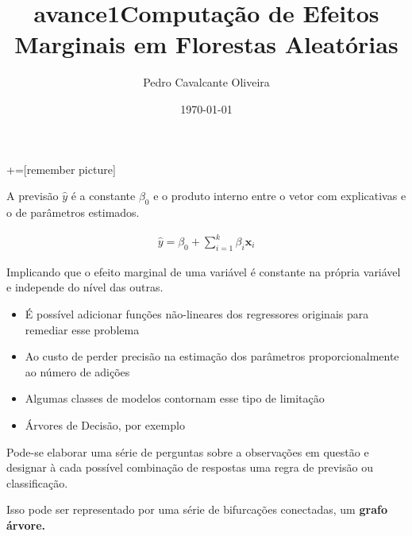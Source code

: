 \documentclass{beamer} %
\title{avance1}
\title{Computação de Efeitos Marginais em Florestas Aleatórias}
\institute[]{Universidade Federal Fluminense}
\author{Pedro Cavalcante Oliveira}
\date{\today}
\newcommand{\1}{\mathbb{I}}
\begin{document}
+=[remember picture]
\lstset{language=C++}   
\everymath{\displaystyle}

\begin{frame}

	\titlepage
\end{frame}




\begin{frame}
A previsão $\hat{y}$ é a constante  $\beta_0$ e o produto interno entre o vetor com explicativas e o de parâmetros estimados.

\begin{align}
    \hat{y} = \beta_0 + \sum_{i=1}^{k} \beta_i \mathbf{x}_i 
\end{align}

Implicando que o efeito marginal de uma variável é constante na própria variável e independe do nível das outras.
\end{frame}



\begin{frame}
\begin{itemize}
    \item É possível adicionar funções não-lineares dos regressores originais para remediar esse problema
    \item Ao custo de perder precisão na estimação dos parâmetros proporcionalmente ao número de adições
    \item Algumas classes de modelos contornam esse tipo de limitação
    \item Árvores de Decisão, por exemplo
\end{itemize}
\end{frame}





\begin{frame}
Pode-se elaborar uma série de perguntas sobre a observações em questão e designar à cada possível combinação de respostas uma regra de previsão ou classificação. 

\BlankLine
\BlankLine
\BlankLine

Isso pode ser representado por uma série de bifurcações conectadas, um \textbf{grafo árvore.}
\end{frame}
\end{document}
